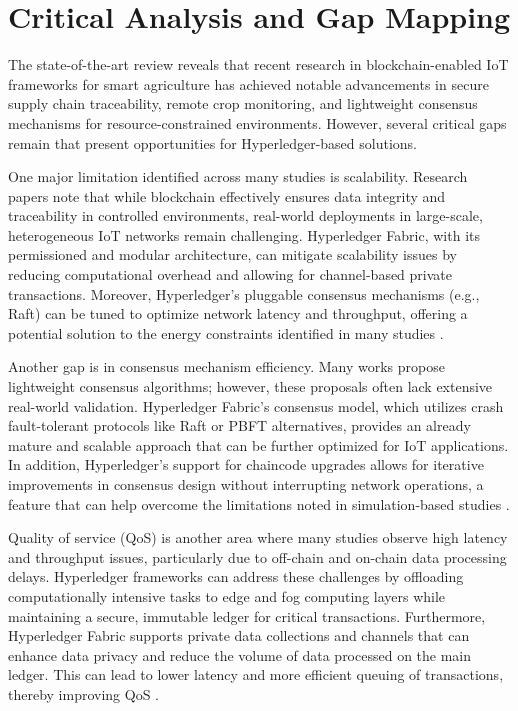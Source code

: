 \documentclass[12pt,onecolumn]{IEEEtran} %
\begin{document}
\section{Critical Analysis and Gap Mapping}\label{sec:critical-gap}
The state-of-the-art review reveals that recent research in blockchain-enabled IoT frameworks for smart agriculture has achieved notable advancements in secure supply chain traceability, remote crop monitoring, and lightweight consensus mechanisms for resource-constrained environments. However, several critical gaps remain that present opportunities for Hyperledger-based solutions.

One major limitation identified across many studies is scalability. Research papers \cite{aliyu2023blockchainbasedsmartfarm, ellahi2023blockchainbasedframeworksfor, sakthivel2024enhancingtransparencyand} note that while blockchain effectively ensures data integrity and traceability in controlled environments, real-world deployments in large-scale, heterogeneous IoT networks remain challenging. Hyperledger Fabric, with its permissioned and modular architecture, can mitigate scalability issues by reducing computational overhead and allowing for channel-based private transactions. Moreover, Hyperledger's pluggable consensus mechanisms (e.g., Raft) can be tuned to optimize network latency and throughput, offering a potential solution to the energy constraints identified in many studies \cite{aliyu2023blockchainbasedsmartfarm, ellahi2023blockchainbasedframeworksfor, sakthivel2024enhancingtransparencyand}.

Another gap is in consensus mechanism efficiency. Many works \cite{ali2022blockchainenabledarchitecture, morais2023surveyonintegration, khan2022ablockchainand} propose lightweight consensus algorithms; however, these proposals often lack extensive real-world validation. Hyperledger Fabric's consensus model, which utilizes crash fault-tolerant protocols like Raft or PBFT alternatives, provides an already mature and scalable approach that can be further optimized for IoT applications. In addition, Hyperledger's support for chaincode upgrades allows for iterative improvements in consensus design without interrupting network operations, a feature that can help overcome the limitations noted in simulation-based studies \cite{saha2022blockchainchangingthe, ali2022blockchainenabledarchitecture}.

Quality of service (QoS) is another area where many studies \cite{ellahi2023blockchainbasedframeworksfor, ellahi2023blockchainbasedframeworksfor, khan2022ablockchainand} observe high latency and throughput issues, particularly due to off-chain and on-chain data processing delays. Hyperledger frameworks can address these challenges by offloading computationally intensive tasks to edge and fog computing layers while maintaining a secure, immutable ledger for critical transactions. Furthermore, Hyperledger Fabric supports private data collections and channels that can enhance data privacy and reduce the volume of data processed on the main ledger. This can lead to lower latency and more efficient queuing of transactions, thereby improving QoS \cite{khan2022ablockchainand, sizan2505asecuredtriad}.
\end{document}
